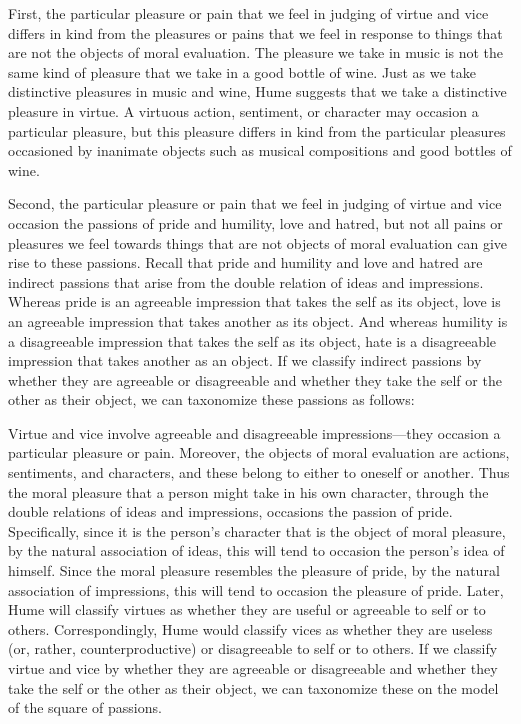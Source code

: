 First, the particular pleasure or pain that we feel in judging of virtue and vice differs in kind from the pleasures or pains that we feel in response to things that are not the objects of moral evaluation. The pleasure we take in music is not the same kind of pleasure that we take in a good bottle of wine. Just as we take distinctive pleasures in music and wine, Hume suggests that we take a distinctive pleasure in virtue. A virtuous action, sentiment, or character may occasion a particular pleasure, but this pleasure differs in kind from the particular pleasures occasioned by inanimate objects such as musical compositions and good bottles of wine.

Second, the particular pleasure or pain that we feel in judging of virtue and vice occasion the passions of pride and humility, love and hatred, but not all pains or pleasures we feel towards things that are not objects of moral evaluation can give rise to these passions. Recall that pride and humility and love and hatred are indirect passions that arise from the double relation of ideas and impressions. Whereas pride is an agreeable impression that takes the self as its object, love is an agreeable impression that takes another as its object. And whereas humility is a disagreeable impression that takes the self as its object, hate is a disagreeable impression that takes another as an object. If we classify indirect passions by whether they are agreeable or disagreeable and whether they take the self or the other as their object, we can taxonomize these passions as follows:

Virtue and vice involve agreeable and disagreeable impressions---they occasion a particular pleasure or pain. Moreover, the objects of moral evaluation are actions, sentiments, and characters, and these belong to either to oneself or another. Thus the moral pleasure that a person might take in his own character, through the double relations of ideas and impressions, occasions the passion of pride. Specifically, since it is the person's character that is the object of moral pleasure, by the natural association of ideas, this will tend to occasion the person's idea of himself. Since the moral pleasure resembles the pleasure of pride, by the natural association of impressions, this will tend to occasion the pleasure of pride. Later, Hume will classify virtues as whether they are useful or agreeable to self or to others. Correspondingly, Hume would classify vices as whether they are useless (or, rather, counterproductive) or disagreeable to self or to others. If we classify virtue and vice by whether they are agreeable or disagreeable and whether they take the self or the other as their object, we can taxonomize these on the model of the square of passions.

